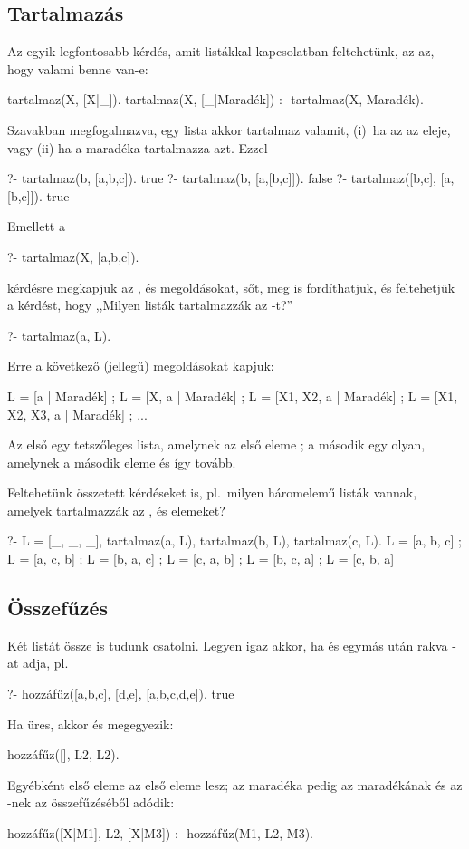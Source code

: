 \subsection*{Tartalmazás}
Az egyik legfontosabb kérdés, amit listákkal
kapcsolatban feltehetünk, az az, hogy valami benne
van-e:
\begin{program}
tartalmaz(X, [X|_]).
tartalmaz(X, [_|Maradék]) :- tartalmaz(X, Maradék).
\end{program}
Szavakban megfogalmazva, egy lista akkor tartalmaz
valamit, (i)~ha az az eleje, vagy (ii) ha a maradéka
tartalmazza azt. Ezzel
\begin{query}
?- tartalmaz(b, [a,b,c]).
true
?- tartalmaz(b, [a,[b,c]]).
false
?- tartalmaz([b,c], [a,[b,c]]).
true
\end{query}
Emellett a
\begin{query}
?- tartalmaz(X, [a,b,c]).
\end{query}
kérdésre megkapjuk az ,  és
 megoldásokat, sőt, meg is fordíthatjuk,
és feltehetjük a kérdést, hogy ,,Milyen listák
tartalmazzák az -t?''
\begin{query}
?- tartalmaz(a, L).
\end{query}
Erre a következő (jellegű) megoldásokat kapjuk:
\begin{query}
L = [a | Maradék] ;
L = [X, a | Maradék] ;
L = [X1, X2, a | Maradék] ;
L = [X1, X2, X3, a | Maradék] ;
...
\end{query}
Az első egy tetszőleges lista, amelynek az első eleme
; a második egy olyan, amelynek a második eleme
 és így tovább.

Feltehetünk összetett kérdéseket is, pl.~milyen
háromelemű listák vannak, amelyek tartalmazzák az
,  és  elemeket?
\begin{query}
?- L = [_, _, _], tartalmaz(a, L),
   tartalmaz(b, L), tartalmaz(c, L).
L = [a, b, c] ;
L = [a, c, b] ;
L = [b, a, c] ;
L = [c, a, b] ;
L = [b, c, a] ;
L = [c, b, a]
\end{query}

\subsection*{Összefűzés}
Két listát össze is tudunk csatolni. Legyen
 igaz akkor, ha  és
 egymás után rakva -at adja, pl.
\begin{query}
?- hozzáfűz([a,b,c], [d,e], [a,b,c,d,e]).
true
\end{query}
Ha  üres, akkor  és 
megegyezik:
\begin{program}
hozzáfűz([], L2, L2).
\end{program}
Egyébként  első eleme az  első eleme
lesz; az  maradéka pedig az 
maradékának és az -nek az összefűzéséből
adódik:
\begin{program}
hozzáfűz([X|M1], L2, [X|M3]) :- hozzáfűz(M1, L2, M3).
\end{program}

